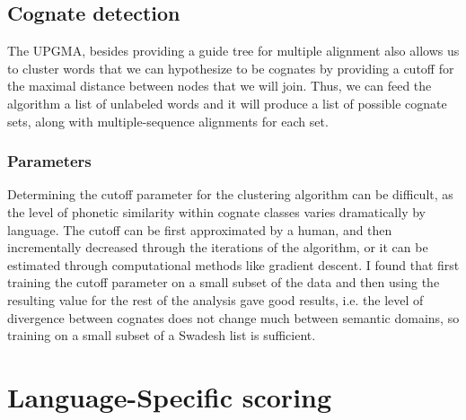 \documentclass[doc,natbib,12pt]{apa6}
\begin{document}
\begin{table}[h]
\end{table}


\subsection{Cognate detection}

The UPGMA, besides providing a guide tree for multiple alignment also allows us to cluster words that we can hypothesize to be cognates by providing a cutoff for the maximal distance between nodes that we will join. Thus, we can feed the algorithm a list of unlabeled words and it will produce a list of possible cognate sets, along with multiple-sequence alignments for each set.  



\subsubsection{Parameters}
Determining the cutoff parameter for the clustering algorithm can be difficult, as the level of phonetic similarity within cognate classes varies dramatically by language. The cutoff can be first approximated by a human, and then incrementally decreased through the iterations of the algorithm, or it can be estimated through computational methods like gradient descent. I found that first training the cutoff parameter on a small subset of the data and then using the resulting value for the rest of the analysis gave good results, i.e. the level of divergence between cognates does not change much between semantic domains, so training on a small subset of a Swadesh list is sufficient. 


\section{Language-Specific scoring}
\end{document}
